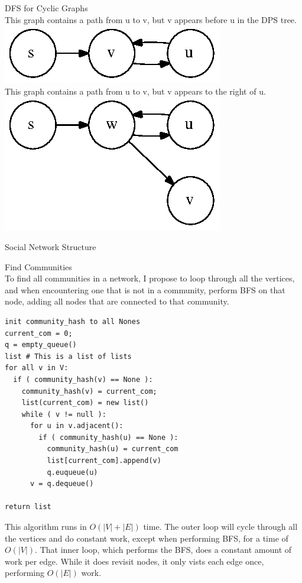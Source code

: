 \documentclass[12pt,twoside]{article}
\begin{document}
\begin{problems}
\begin{problemparts}
\problempart DFS for Cyclic Graphs\\
This graph contains a path from u to v, but v appears before u in the DPS tree.\\
\includegraphics{after.eps}\\
This graph contains a path from u to v, but v appears to the right of u.\\
\includegraphics{before.eps}\\
\end{problemparts}
\problem Social Network Structure\\
\begin{problemparts}
\problempart Find Communities\\
To find all communities in a network, I propose to loop through all the vertices, and when encountering one that is not in a community, perform BFS on that node, adding all nodes that are connected to that community. \\
\begin{lstlisting}
init community_hash to all Nones
current_com = 0;
q = empty_queue()
list # This is a list of lists
for all v in V:
  if ( community_hash(v) == None ):
    community_hash(v) = current_com;
    list(current_com) = new list()
    while ( v != null ):
      for u in v.adjacent():
        if ( community_hash(u) == None ):
          community_hash(u) = current_com
          list[current_com].append(v)
          q.euqueue(u)
      v = q.dequeue()

return list
\end{lstlisting}
This algorithm runs in $O(|V| + |E|)$ time.  The outer loop will cycle through all the vertices and do constant work, except when performing BFS, for a time of $O(|V|)$.  That inner loop, which performs the BFS, does a constant amount of work per edge.  While it does revisit nodes, it only vists each edge once, performing $O(|E|)$ work.\\


\end{problemparts}
\end{problems}
\end{document}
